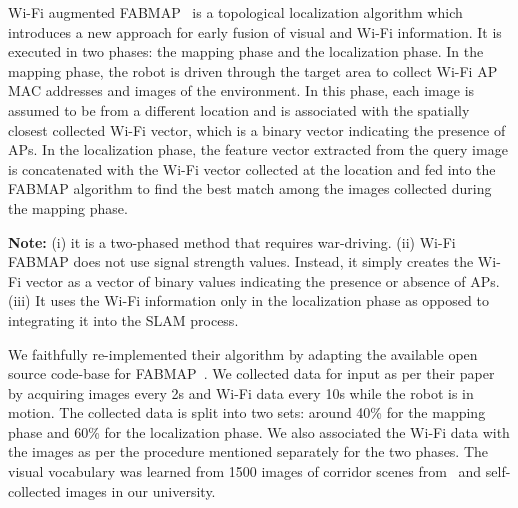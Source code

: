 Wi-Fi augmented FABMAP~\cite{visual_wifi_2} is a topological localization algorithm which introduces a new approach for early fusion of visual and Wi-Fi information. It is executed in two phases: the mapping phase and the localization phase.
In the mapping phase, the robot is driven through the target area to collect Wi-Fi AP MAC addresses and images of the environment.
In this phase, each image is assumed to be from a different location and is associated with the spatially closest collected Wi-Fi vector, which is a binary vector indicating the presence of APs.
In the localization phase, the feature vector extracted from the query image is concatenated with the Wi-Fi vector collected at the location and fed into the FABMAP algorithm to find the best match among the images collected during the mapping phase.

{\bf Note:} (i) it is a two-phased method that requires war-driving. (ii) Wi-Fi FABMAP does not use signal strength values. Instead, it simply creates the Wi-Fi vector as a vector of binary values indicating the presence or absence of APs. (iii) It uses the Wi-Fi information only in the localization phase as opposed to integrating it into the SLAM process.

We faithfully re-implemented their algorithm by adapting the available open source code-base for FABMAP~\cite{glover2012openfabmap}. We collected data for input as per their paper by acquiring images every 2s and Wi-Fi data every 10s while the robot is in motion. The collected data is split into two sets: around 40\% for the mapping phase and 60\% for the localization phase. We also associated the Wi-Fi data with the images as per the procedure mentioned separately for the two phases.
The visual vocabulary was learned from 1500 images of corridor scenes from~\cite{yang_icra16,quattoni_cvpr09} and self-collected images in our university.


